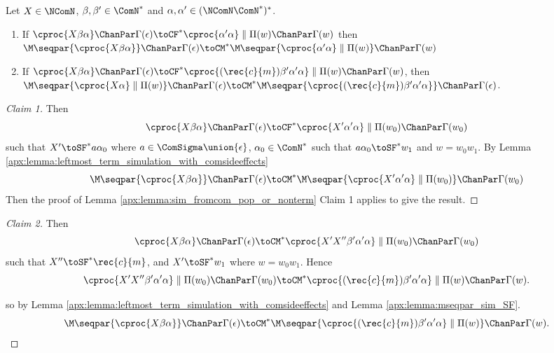 \begin{lemma}\label{apx:lemma:sim_fromncom_push_or_nonterm}
Let $X \in \NComN$, $\beta,\beta' \in \ComN^*$ and $\alpha,\alpha' \in (\NComN\ComN^*)^*$.
\begin{enumerate}
	\item If $\cproc{X\beta\alpha} \ChanPar \Gamma(\epsilon) \toCF^*  
	          \cproc{\alpha'\alpha} \parallel \Pi(w) \ChanPar \Gamma(w)$
	      then 
	      $\M\seqpar{\cproc{X\beta\alpha}} \ChanPar \Gamma(\epsilon) \toCM^* 
	      \M\seqpar{\cproc{\alpha'\alpha} \parallel \Pi(w)} \ChanPar \Gamma(w)$
	\item If $\cproc{X\beta\alpha} \ChanPar \Gamma(\epsilon) \toCF^* \cproc{(\rec{c}{m})\beta'\alpha'\alpha} \parallel \Pi(w) \ChanPar \Gamma(w)$, then $\M\seqpar{\cproc{X\alpha} \parallel \Pi(w)} \ChanPar \Gamma(\epsilon) \toCM^* \M\seqpar{\cproc{(\rec{c}{m})\beta'\alpha'\alpha}} \ChanPar \Gamma(\epsilon)$.
\end{enumerate}
\end{lemma}
\begin{proof}[Claim 1]
Then 
$$\cproc{X\beta\alpha} \ChanPar \Gamma(\epsilon) \toCF^* 
\cproc{X'\alpha'\alpha} \parallel \Pi(w_0) \ChanPar \Gamma(w_0)$$
such that $X' \toSF^* a\alpha_0$ where 
$a \in \ComSigma \union \{\epsilon\}$, $\alpha_0 \in \ComN^*$ such that $a\alpha_0 \toSF^* w_1$ and $w = w_0w_1$. 
By Lemma \ref{apx:lemma:leftmost_term_simulation_with_comsideeffects} 
$$\M\seqpar{\cproc{X\beta\alpha}} \ChanPar \Gamma(\epsilon) \toCM^* \M\seqpar{\cproc{X'\alpha'\alpha} \parallel \Pi(w_0)} \ChanPar \Gamma(w_0)$$
Then the proof of Lemma \ref{apx:lemma:sim_fromcom_pop_or_nonterm} Claim 1 applies to give the result.
\end{proof}
\begin{proof}[Claim 2]
Then 
$$\cproc{X\beta\alpha} \ChanPar \Gamma(\epsilon) \toCM^* \cproc{X'X''\beta'\alpha'\alpha} \parallel \Pi(w_0) \ChanPar \Gamma(w_0)$$
such that $X'' \toSF^* \rec{c}{m}$, and $X' \toSF^* w_1$ where $w=w_0w_1$. Hence
$$\cproc{X'X''\beta'\alpha'\alpha} \parallel \Pi(w_0) \ChanPar \Gamma(w_0) \toCM^* \cproc{(\rec{c}{m})\beta'\alpha'\alpha} \parallel \Pi(w) \ChanPar \Gamma(w).$$

so by Lemma \ref{apx:lemma:leftmost_term_simulation_with_comsideeffects} and Lemma \ref{apx:lemma:mseqpar_sim_SF}.
$$\M\seqpar{\cproc{X\beta\alpha}} \ChanPar \Gamma(\epsilon) \toCM^* 
  \M\seqpar{\cproc{(\rec{c}{m})\beta'\alpha'\alpha} \parallel \Pi(w)} \ChanPar \Gamma(w).$$
\end{proof}

